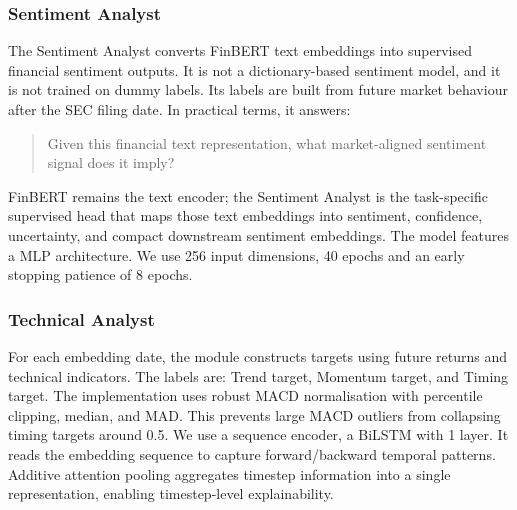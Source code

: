 \documentclass[conference]{IEEEtran}
\begin{document}
\subsubsection{Sentiment Analyst}
The Sentiment Analyst converts FinBERT text embeddings into supervised financial sentiment outputs. It is not a dictionary-based sentiment model, and it is not trained on dummy labels. Its labels are built from future market behaviour after the SEC filing date. In practical terms, it answers:
\begin{quote}
    Given this financial text representation, what market-aligned sentiment signal does it imply?
\end{quote}
FinBERT remains the text encoder; the Sentiment Analyst is the task-specific supervised head that maps those text embeddings into sentiment, confidence, uncertainty, and compact downstream sentiment embeddings. The model features a MLP architecture. We use 256 input dimensions, 40 epochs and an early stopping patience of 8 epochs.
\subsubsection{Technical Analyst}
For each embedding date, the module constructs targets using future returns and technical indicators. The labels are: Trend target, Momentum target, and Timing target. The implementation uses robust MACD normalisation with percentile clipping, median, and MAD. This prevents large MACD outliers from collapsing timing targets around 0.5. We use a sequence encoder, a BiLSTM with 1 layer. It reads the embedding sequence to capture forward/backward temporal patterns. Additive attention pooling aggregates timestep information into a single representation, enabling timestep-level explainability. 
\end{document}

